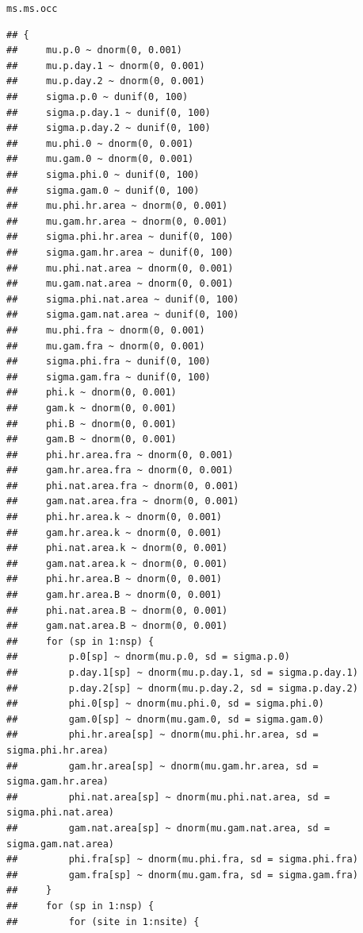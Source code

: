 \documentclass{article}\usepackage[]{graphicx}\usepackage[]{color}
\makeatletter
\newcommand{\hlstd}[1]{\textcolor[rgb]{0.345,0.345,0.345}{#1}}%
\newenvironment{kframe}{%
 \def\at@end@of@kframe{}%
 \ifinner\ifhmode%
  \def\at@end@of@kframe{\end{minipage}}%
  \begin{minipage}{\columnwidth}%
 \fi\fi%
 \def\FrameCommand##1{\hskip\@totalleftmargin \hskip-\fboxsep
 \colorbox{shadecolor}{##1}\hskip-\fboxsep
     \hskip-\linewidth \hskip-\@totalleftmargin \hskip\columnwidth}%
 \MakeFramed {\advance\hsize-\width
   \@totalleftmargin\z@ \linewidth\hsize
   \@setminipage}}%
 {\par\unskip\endMakeFramed%
 \at@end@of@kframe}
\newenvironment{knitrout}{}{} %
\makeatother
\begin{document}
\begin{knitrout}
\color{fgcolor}\begin{kframe}
\begin{alltt}
\hlstd{ms.ms.occ}
\end{alltt}
\begin{verbatim}
## {
##     mu.p.0 ~ dnorm(0, 0.001)
##     mu.p.day.1 ~ dnorm(0, 0.001)
##     mu.p.day.2 ~ dnorm(0, 0.001)
##     sigma.p.0 ~ dunif(0, 100)
##     sigma.p.day.1 ~ dunif(0, 100)
##     sigma.p.day.2 ~ dunif(0, 100)
##     mu.phi.0 ~ dnorm(0, 0.001)
##     mu.gam.0 ~ dnorm(0, 0.001)
##     sigma.phi.0 ~ dunif(0, 100)
##     sigma.gam.0 ~ dunif(0, 100)
##     mu.phi.hr.area ~ dnorm(0, 0.001)
##     mu.gam.hr.area ~ dnorm(0, 0.001)
##     sigma.phi.hr.area ~ dunif(0, 100)
##     sigma.gam.hr.area ~ dunif(0, 100)
##     mu.phi.nat.area ~ dnorm(0, 0.001)
##     mu.gam.nat.area ~ dnorm(0, 0.001)
##     sigma.phi.nat.area ~ dunif(0, 100)
##     sigma.gam.nat.area ~ dunif(0, 100)
##     mu.phi.fra ~ dnorm(0, 0.001)
##     mu.gam.fra ~ dnorm(0, 0.001)
##     sigma.phi.fra ~ dunif(0, 100)
##     sigma.gam.fra ~ dunif(0, 100)
##     phi.k ~ dnorm(0, 0.001)
##     gam.k ~ dnorm(0, 0.001)
##     phi.B ~ dnorm(0, 0.001)
##     gam.B ~ dnorm(0, 0.001)
##     phi.hr.area.fra ~ dnorm(0, 0.001)
##     gam.hr.area.fra ~ dnorm(0, 0.001)
##     phi.nat.area.fra ~ dnorm(0, 0.001)
##     gam.nat.area.fra ~ dnorm(0, 0.001)
##     phi.hr.area.k ~ dnorm(0, 0.001)
##     gam.hr.area.k ~ dnorm(0, 0.001)
##     phi.nat.area.k ~ dnorm(0, 0.001)
##     gam.nat.area.k ~ dnorm(0, 0.001)
##     phi.hr.area.B ~ dnorm(0, 0.001)
##     gam.hr.area.B ~ dnorm(0, 0.001)
##     phi.nat.area.B ~ dnorm(0, 0.001)
##     gam.nat.area.B ~ dnorm(0, 0.001)
##     for (sp in 1:nsp) {
##         p.0[sp] ~ dnorm(mu.p.0, sd = sigma.p.0)
##         p.day.1[sp] ~ dnorm(mu.p.day.1, sd = sigma.p.day.1)
##         p.day.2[sp] ~ dnorm(mu.p.day.2, sd = sigma.p.day.2)
##         phi.0[sp] ~ dnorm(mu.phi.0, sd = sigma.phi.0)
##         gam.0[sp] ~ dnorm(mu.gam.0, sd = sigma.gam.0)
##         phi.hr.area[sp] ~ dnorm(mu.phi.hr.area, sd = sigma.phi.hr.area)
##         gam.hr.area[sp] ~ dnorm(mu.gam.hr.area, sd = sigma.gam.hr.area)
##         phi.nat.area[sp] ~ dnorm(mu.phi.nat.area, sd = sigma.phi.nat.area)
##         gam.nat.area[sp] ~ dnorm(mu.gam.nat.area, sd = sigma.gam.nat.area)
##         phi.fra[sp] ~ dnorm(mu.phi.fra, sd = sigma.phi.fra)
##         gam.fra[sp] ~ dnorm(mu.gam.fra, sd = sigma.gam.fra)
##     }
##     for (sp in 1:nsp) {
##         for (site in 1:nsite) {

\end{verbatim}
\end{kframe}
\end{knitrout}
\end{document}
